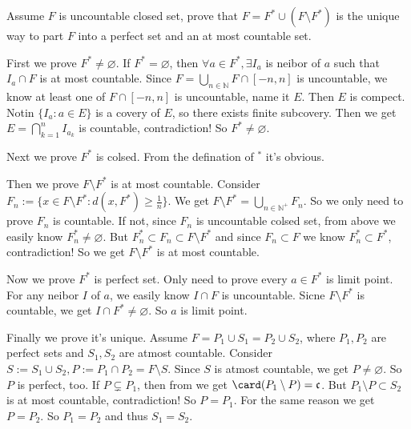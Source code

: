 \documentclass{ctexart}
\begin{document}
\begin{problem}
  Assume \(F\) is uncountable closed set, prove that \(F=F^{*} \cup (F\setminus F^{*})\) is the unique way to part \(F\) into a perfect set and an at most countable set. 
\end{problem}

\begin{solution}
  First we prove \(F^{*} \neq \varnothing\). If \(F^{*}=\varnothing\), then \(\forall a \in F^{*},\exists I_a\) is neibor of \(a\) such that 
  \(I_a \cap F\) is at most countable. 
  Since \(F= \bigcup_{n \in \mathbb{N}} F \cap [-n,n]\) is uncountable, we know at least one of \(F \cap [-n,n]\) is uncountable, name it \(E\). 
  Then \(E\) is compect. Notin \(\{I_a:a \in E\}\) is a covery of \(E\), so there exists finite subcovery. 
  Then we get \(E=\bigcap_{k=1}^{n} I_{a_k}\) is countable, contradiction! 
  So \(F^{*} \neq \varnothing\).

  Next we prove \(F^{*}\) is colsed. From the defination of \({}^{*}\) it's obvious.

  Then we prove \(F \setminus F^{*}\) is at most countable. 
  Consider \(F_n:=\{x \in F\setminus F^{*}:d(x,F^{*})\geq\frac{1}{n}\}\). We get \(F \setminus F^{*}=\bigcup_{n \in \mathbb{N}^{+}} F_n \). 
  So we only need to prove \(F_n\) is countable. If not, since \(F_n\) is uncountable colsed set, from above we easily know \(F_n^{*} \neq \varnothing\). 
  But \(F_n^{*} \subset F_n \subset F\setminus F^{*}\) and since \(F_n \subset F\) we know \(F_n^{*}\subset F^{*}\), contradiction! 
  So we get \(F\setminus F^{*}\) is at most countable. 

  Now we prove \(F^{*}\) is perfect set. Only need to prove every \(a \in F^{*}\) is limit point. 
  For any neibor \(I\) of \(a\), we easily know \(I \cap F\) is uncountable. 
  Sicne \(F \setminus F^{*}\) is countable, we get \(I \cap F^{*}\neq \varnothing\). 
  So \(a\) is limit point. 

  Finally we prove it's unique. Assume \(F=P_1 \cup S_1=P_2 \cup S_2\), where \(P_1,P_2\) are perfect sets and \(S_1,S_2\) are atmost countable. 
  Consider \(S:=S_1 \cup S_2,P:=P_1 \cap P_2 = F\setminus S\). Since \(S\) is atmost countable, we get \(P \neq \varnothing\). 
  So \(P\) is perfect, too. 
  If \(P \subsetneq P_1\), then from  we get \(\card(P_1\setminus P)=\mathfrak{c}\). 
  But \(P_1\setminus P \subset S_2\) is at most countable, contradiction! 
  So \(P=P_1\). For the same reason we get \(P=P_2\). So \(P_1=P_2\) and thus \(S_1=S_2\). 
\end{solution}
\end{document}
